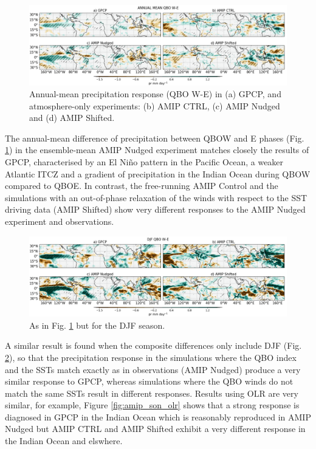 \begin{figure}[t!]
\centering
 \includegraphics[width=\linewidth]{figures/pr_amip_climqbowqboe.png}
\caption[Annual mean precipitation response in atmosphere-only experiments]{Annual-mean precipitation response (QBO W-E) in (a) GPCP, and atmosphere-only experiments: (b) AMIP CTRL, (c) AMIP Nudged and (d) AMIP Shifted.  }
\label{fig:amip_clim}
\end{figure}


The annual-mean difference of precipitation between QBOW and E phases (Fig. \ref{fig:amip_clim}) in the ensemble-mean AMIP Nudged experiment matches closely the results of GPCP, characterised by an El Niño pattern in the Pacific Ocean, a weaker Atlantic ITCZ and a gradient of precipitation in the Indian Ocean during QBOW compared to QBOE. 
In contrast, the free-running AMIP Control and the simulations with an out-of-phase relaxation of the winds with respect to the SST driving data (AMIP Shifted) show very different responses to the AMIP Nudged experiment and observations. 

\begin{figure}[t!]
\centering
 \includegraphics[width=\linewidth]{figures/pr_amip_djfqbowqboe.png}
\caption[DJF mean precipitation response in atmosphere-only experiments]{As in Fig. \ref{fig:amip_clim} but for the DJF season. }
\label{fig:amip_djf}
\end{figure}

A similar result is found when the composite differences only include DJF (Fig. \ref{fig:amip_djf}), so that the precipitation response in the simulations where the QBO index and the SSTs match exactly as in observations (AMIP Nudged) produce a very similar response to GPCP, whereas simulations where the QBO winds do not match the same SSTs result in different responses. 
Results using OLR are very similar, for example, Figure \ref{fig:amip_son_olr} shows that a strong response is diagnosed in GPCP in the Indian Ocean which is reasonably reproduced in AMIP Nudged but AMIP CTRL and AMIP Shifted exhibit a very different response in the Indian Ocean and elswhere.



